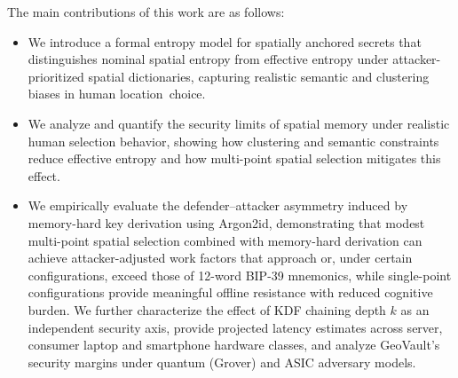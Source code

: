 \documentclass[mathematics,article,accept,pdftex,moreauthors]{Definitions/mdpi}
\begin{document}
{The main contributions of this work are as follows:}
\begin{itemize}
\item We introduce a formal entropy model for spatially anchored secrets that distinguishes nominal spatial entropy from effective entropy under attacker-prioritized spatial dictionaries, capturing realistic semantic and clustering biases in human \mbox{location choice.}
\item We analyze and quantify the security limits of spatial memory under realistic human selection behavior, showing how clustering and semantic constraints reduce effective entropy and how multi-point spatial selection mitigates this effect.
\item We empirically evaluate the defender--attacker asymmetry induced by memory-hard key derivation using Argon2id, demonstrating that modest multi-point spatial selection combined with memory-hard derivation can achieve attacker-adjusted work factors that approach or, under certain configurations, exceed those of 12-word BIP-39 mnemonics, while single-point configurations provide meaningful offline resistance with reduced cognitive burden. We further characterize the effect of KDF chaining depth $k$ as an independent security axis, provide projected latency estimates across server, consumer laptop and smartphone hardware classes, and analyze GeoVault's security margins under quantum (Grover) and ASIC adversary models.
\end{itemize}
\end{document}

